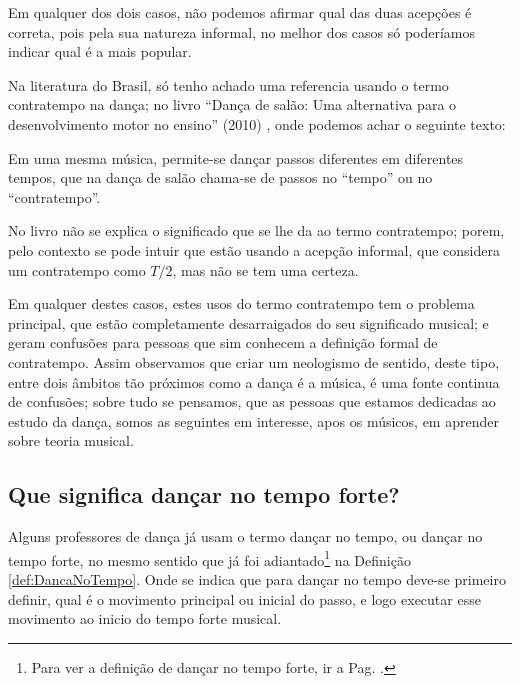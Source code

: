 Em qualquer dos dois casos, não podemos afirmar qual das duas acepções é correta,
pois pela sua natureza informal,
no melhor dos casos só poderíamos indicar qual é a mais popular.

Na literatura do Brasil, só tenho achado uma referencia usando o termo contratempo na dança;
no livro ``Dança de salão: Uma alternativa para o desenvolvimento motor no ensino'' 
(2010) \cite{maia2010danca}, onde podemos achar o seguinte texto:
\begin{citando}
Em uma mesma música, permite-se dançar passos diferentes em diferentes tempos,
que na dança de salão chama-se de passos no ``tempo'' ou no ``contratempo''.
\end{citando}
No livro não se explica o significado que se lhe da ao termo contratempo;
porem, pelo contexto se pode intuir que estão usando a acepção informal, 
que considera um contratempo como $T/2$, mas não se tem uma certeza.

Em qualquer destes casos, 
estes usos do termo contratempo tem o problema principal, 
que estão completamente desarraigados do seu significado musical;
e geram confusões para pessoas que sim conhecem a definição formal de contratempo.
Assim observamos que criar um neologismo de sentido, deste tipo, 
entre dois âmbitos tão próximos como a dança é a música, é uma fonte continua de confusões;
sobre tudo se pensamos, que as pessoas que estamos dedicadas ao estudo da dança,
somos as seguintes em interesse, apos os músicos, em aprender sobre teoria musical.


\subsection{Que significa dançar no tempo forte?}
Alguns professores de dança já usam o termo dançar no tempo, 
ou dançar no tempo forte, no mesmo sentido que já foi adiantado\footnote{Para 
ver a definição de dançar no tempo forte, ir a Pag. \pageref{def:DancaNoTempo}.}
 na Definição \ref{def:DancaNoTempo}.
Onde se indica que para dançar no tempo deve-se primeiro definir,
 qual é o movimento principal ou inicial do passo,
e logo executar esse movimento ao inicio do tempo forte musical.


